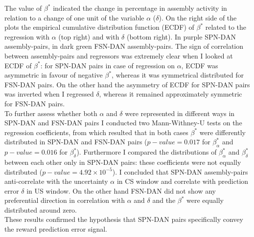 The value of $\beta^*$ indicated the change in percentage in assembly activity in relation to a change of one unit of the variable $\alpha$ ($\delta$). On the right side of the plots the empirical cumulative distribution function (ECDF) of $\beta^*$ related to the regression with $\alpha$ (top right) and with $\delta$ (bottom right). In purple SPN-DAN assembly-pairs, in dark green FSN-DAN assembly-pairs. The sign of correlation between assembly-pairs and regressors was extremely clear when I looked at ECDF of $\beta^*$: for SPN-DAN pairs in case of regression on $\alpha$, ECDF was asymmetric in favour of negative $\beta^*$, whereas it was symmetrical distributed for FSN-DAN pairs. On the other hand the asymmetry of ECDF for SPN-DAN pairs was inverted when I regressed $\delta$, whereas it remained approximately symmetric for FSN-DAN pairs.\\To further assess whether both $\alpha$ and $\delta$ were represented in different ways in SPN-DAN and FSN-DAN pairs I conducted two Mann-Withney-U tests on the regression coefficients, from which resulted that in both cases $\beta^*$ were differently distributed in SPN-DAN and FSN-DAN pairs ($p-value=0.017$ for $\beta^*_{\alpha}$ and $p-value=0.016$ for $\beta^*_{\delta}$). Furthermore I compared the distributions of $\beta^*_{\alpha}$ and $\beta^*_{\delta}$ between each other only in SPN-DAN pairs: these coefficients were not equally distributed ($p-value=4.92\times10^{-5}$). I concluded that SPN-DAN assembly-pairs anti-correlate with the uncertainty $\alpha$ in CS window and correlate with prediction error $\delta$ in US window. On the other hand FSN-DAN did not show any preferential direction in correlation with $\alpha$ and $\delta$ and the $\beta^*$ were equally distributed around zero.\\These results confirmed the hypothesis that SPN-DAN pairs specifically convey the reward prediction error signal.
